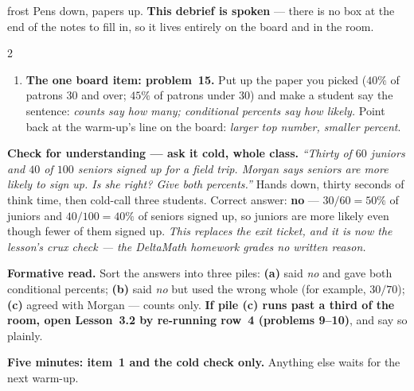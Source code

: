\documentclass[10pt]{article}
\begin{document}
\boxguard[24]
\begin{skillbox}{frost}
Pens down, papers up. \textbf{This debrief is spoken} --- there is no box at the end of the
notes to fill in, so it lives entirely on the board and in the room.
\begin{multicols}{2}
\begin{enumerate}[leftmargin=1.3em, nosep, itemsep=3pt]
  \item \textbf{The one board item: problem~15.} Put up the paper you picked ($40\%$ of patrons
        $30$ and over; $45\%$ of patrons under $30$) and make a student say the sentence:
        \emph{counts say how many; conditional percents say how likely.} Point back at the
        warm-up's line on the board: \emph{larger top number, smaller percent}.
\end{enumerate}
\columnbreak
\textbf{Check for understanding --- ask it cold, whole class.} \emph{``Thirty of $60$ juniors and
$40$ of $100$ seniors signed up for a field trip. Morgan says seniors are more likely to sign
up. Is she right? Give both percents.''} Hands down, thirty seconds of think time, then cold-call
three students. Correct answer: \textbf{no} --- $30/60 = 50\%$ of juniors and $40/100 = 40\%$ of
seniors signed up, so juniors are more likely even though fewer of them signed up. \emph{This
replaces the exit ticket, and it is now the lesson's crux check --- the DeltaMath homework grades
no written reason.}

\textbf{Formative read.} Sort the answers into three piles: \textbf{(a)} said \emph{no} and gave
both conditional percents; \textbf{(b)} said \emph{no} but used the wrong whole (for example,
$30/70$); \textbf{(c)} agreed with Morgan --- counts only. \textbf{If pile (c) runs past a third
of the room, open Lesson~3.2 by re-running row~4 (problems 9--10)}, and say so plainly.

\textbf{Five minutes: item~1 and the cold check only.} Anything else waits for the next warm-up.
\end{multicols}
\end{skillbox}
\end{document}
